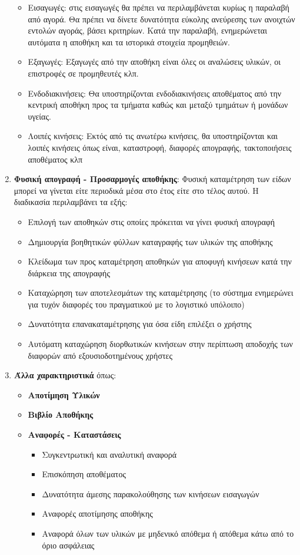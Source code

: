 \begin{enumerate}
    \begin{itemize}
      \item Εισαγωγές: στις εισαγωγές θα πρέπει να περιλαμβάνεται κυρίως η παραλαβή από αγορά. Θα πρέπει να δίνετε δυνατότητα εύκολης ανεύρεσης των ανοιχτών εντολών αγοράς, βάσει κριτηρίων. Κατά την παραλαβή, ενημερώνεται αυτόματα η αποθήκη και τα ιστορικά στοιχεία προμηθειών.
      \item Εξαγωγές: Εξαγωγές από την αποθήκη είναι όλες οι αναλώσεις υλικών, οι επιστροφές σε προμηθευτές κλπ.
      \item Ενδοδιακινήσεις: Θα υποστηρίζονται ενδοδιακινήσεις αποθέματος από την κεντρική αποθήκη προς τα τμήματα καθώς και μεταξύ τμημάτων ή μονάδων υγείας.
      \item Λοιπές κινήσεις: Εκτός από τις ανωτέρω κινήσεις, θα υποστηρίζονται και λοιπές κινήσεις όπως είναι, καταστροφή, διαφορές απογραφής, τακτοποιήσεις αποθέματος κλπ
    \end{itemize}
  \item \textbf{Φυσική απογραφή - Προσαρμογές αποθήκης}: Φυσική καταμέτρηση των είδων μπορεί να γίνεται είτε περιοδικά μέσα στο έτος είτε στο τέλος αυτού. Η διαδικασία περιλαμβάνει τα εξής:
    \begin{itemize}
      \item Επιλογή των αποθηκών στις οποίες πρόκειται να γίνει φυσική απογραφή
      \item Δημιουργία βοηθητικών φύλλων καταγραφής των υλικών της αποθήκης
      \item Κλείδωμα των προς καταμέτρηση αποθηκών για αποφυγή κινήσεων κατά την διάρκεια της απογραφής
      \item Καταχώρηση των αποτελεσμάτων της καταμέτρησης (το σύστημα ενημερώνει για τυχόν διαφορές του πραγματικού με το λογιστικό υπόλοιπο)
      \item Δυνατότητα επανακαταμέτρησης για όσα είδη επιλέξει ο χρήστης
      \item Αυτόματη καταχώρηση διορθωτικών κινήσεων στην περίπτωση αποδοχής των διαφορών από εξουσιοδοτημένους χρήστες
    \end{itemize}
  \item \textbf{Άλλα χαρακτηριστικά} όπως:
    \begin{itemize}
      \item \textbf{Αποτίμηση Υλικών}
      \item \textbf{Βιβλίο Αποθήκης}
      \item \textbf{Αναφορές - Καταστάσεις}
        \begin{itemize}
          \item Συγκεντρωτική και αναλυτική αναφορά
          \item Επισκόπηση αποθέματος
          \item Δυνατότητα άμεσης παρακολούθησης των κινήσεων εισαγωγών
          \item Αναφορές αποτίμησης αποθήκης
          \item Αναφορά όλων των υλικών με μηδενικό απόθεμα ή απόθεμα κάτω από το όριο ασφάλειας
        \end{itemize}
    \end{itemize}
\end{enumerate}


